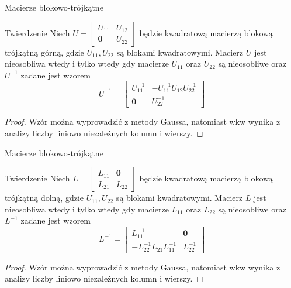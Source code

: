 \documentclass{beamer}
\newcommand{\zero}{\mathbf{0}}
\begin{document}
\begin{frame}{Macierze blokowo-trójkątne}
    \begin{block}{Twierdzenie}
        Niech $U = \begin{bmatrix}
            U_{11} & U_{12} \\ \zero & U_{22}
        \end{bmatrix}$
        będzie kwadratową macierzą blokową trójkątną górną, gdzie $U_{11}, U_{22}$ są blokami kwadratowymi. Macierz $U$ jest nieosobliwa wtedy i tylko wtedy 
        gdy macierze $U_{11}$ oraz  $U_{22}$ są nieosobliwe oraz $U^{-1}$ zadane jest wzorem
        $$ U^{-1} = \begin{bmatrix}
            U_{11}^{-1} & -U_{11}^{-1} U_{12} U _{22}^{-1} \\ \zero & U_{22}^{-1}
        \end{bmatrix}$$
    \end{block}
    \pause 
    \begin{proof}
        Wzór można wyprowadzić z metody Gaussa, 
        natomiast wkw wynika z analizy liczby liniowo niezależnych kolumn i wierszy.
    \end{proof}
\end{frame}

\begin{frame}{Macierze blokowo-trójkątne}
    \begin{block}{Twierdzenie}
        Niech $L = \begin{bmatrix}
            L_{11} & \zero \\ L_{21} & L_{22}
        \end{bmatrix}$
        będzie kwadratową macierzą blokową trójkątną dolną, gdzie $U_{11}, U_{22}$ są blokami kwadratowymi. Macierz $L$ jest nieosobliwa wtedy i tylko wtedy 
        gdy macierze $L_{11}$ oraz  $L_{22}$ są nieosobliwe oraz $L^{-1}$ zadane jest wzorem
        $$ L^{-1} = \begin{bmatrix}
            L_{11}^{-1} & \zero\\ -L_{22}^{-1} L_{21} L _{11}^{-1}  & L_{22}^{-1}
        \end{bmatrix}$$
    \end{block}
    \pause 
    \begin{proof}
        Wzór można wyprowadzić z metody Gaussa, 
        natomiast wkw wynika z analizy liczby liniowo niezależnych kolumn i wierszy.
    \end{proof}
\end{frame}
\end{document}

